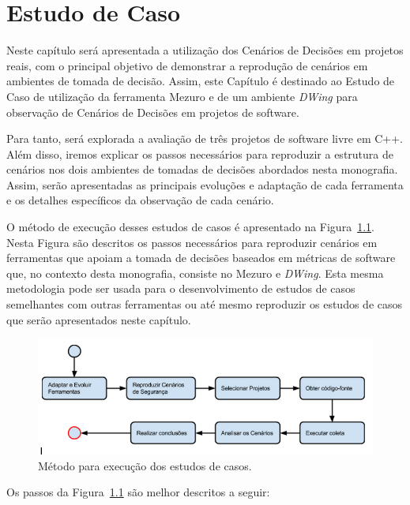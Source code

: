 \chapter{Estudo de Caso}
\label{cap-case-study}

%

Neste capítulo será apresentada a utilização dos Cenários de Decisões em projetos reais, com o principal objetivo de demonstrar a reprodução de cenários em ambientes de tomada de decisão. Assim, este Capítulo é destinado ao Estudo de Caso de utilização da ferramenta Mezuro e de um ambiente \emph{DWing} para observação de Cenários de Decisões em projetos de software.

Para tanto, será explorada a avaliação de três projetos de software livre em C++. Além disso, iremos explicar os passos necessários para reproduzir a estrutura de cenários nos dois ambientes de tomadas de decisões abordados nesta monografia. Assim, serão apresentadas as principais evoluções e adaptação de cada ferramenta e os detalhes específicos da observação de cada cenário.

O método de execução desses estudos de casos é apresentado na Figura~\ref{method}. Nesta Figura são descritos os passos necessários para reproduzir cenários em ferramentas que apoiam a tomada de decisões baseados em métricas de software que, no contexto desta monografia, consiste no Mezuro e \emph{DWing}. Esta mesma metodologia pode ser usada para o desenvolvimento de estudos de casos semelhantes com outras ferramentas ou até mesmo reproduzir os estudos de casos que serão apresentados neste capítulo.

\graphicspath{{figuras/}}
\begin{figure}[h]
\centering
\includegraphics[width=1.0\textwidth]{fluxograma}
\caption{Método para execução dos estudos de casos.}
\label{method}
\end{figure}

Os passos da Figura~\ref{method} são melhor descritos a seguir:


